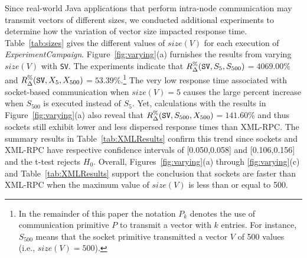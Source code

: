 \documentclass{sig-alternate}
\begin{document}
Since real-world Java applications that perform intra-node
communication may transmit vectors of different sizes, we conducted
additional experiments to determine how the variation of vector size
impacted response time.  Table~\ref{tab:sizes} gives the different
values of $size(V)$ for each execution of {\em ExperimentCampaign}.
Figure~\ref{fig:varying}(a) furnishes the results from varying
$size(V)$ with \texttt{SV}. The experiments indicate that {\small
  $R_\Delta^\%(\mbox{{\tt SV}},S_5,S_{500})$}$=4069.00\%$ and {\small
  $R_\Delta^\%(\mbox{{\tt
      SV}},X_5,X_{500})$}$=53.39\%$.\footnote{{\small In the remainder
    of this paper the notation $P_k$ denotes the use of communication
    primitive $P$ to transmit a vector with $k$ entries.  For
    instance, $S_{500}$ means that the socket primitive transmitted a
    vector $V$ of 500 values (i.e., $size(V)=500$).}}  The very low
response time associated with socket-based communication when
$size(V)=5$ causes the large percent increase when $S_{500}$ is
executed instead of $S_{5}$.  Yet, calculations with the results in
Figure~\ref{fig:varying}(a) also reveal that {\small
  $R_\Delta^\%(\mbox{{\tt SV}},S_{500},X_{500})$}$=141.60\%$ and thus
sockets still exhibit lower and less dispersed response times than
XML-RPC.  The summary results in Table~\ref{tab:XMLResults} confirm
this trend since sockets and XML-RPC have respective confidence
intervals of [0.050,0.058] and [0.106,0.156] and the t-test rejects
$H_0$.  Overall, Figures~\ref{fig:varying}(a) through
\ref{fig:varying}(c) and Table~\ref{tab:XMLResults} support the
conclusion that sockets are faster than XML-RPC when the maximum value
of $size(V)$ is less than or equal to 500.
\end{document}
